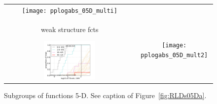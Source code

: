 \documentclass{article}
\newcommand{\rot}[2][2.5]{
  \hspace*{-3.5\baselineskip}%
  \begin{rotate}{90}\hspace{#1em}#2
  \end{rotate}}
\begin{document}
\begin{figure}[htbp!]
\begin{tabular}{@{}c@{}c@{}}
\texttt{[image: pplogabs\_05D\_multi]}
\\[-1ex]
\rot[1.5]{weak structure fcts}
\includegraphics[width=0.41\textwidth,trim=0 0mm 16mm 11mm, clip]{pprldistr_05D_mult2} &
\texttt{[image: pplogabs\_05D\_mult2]}
\end{tabular}
\vspace*{-0.5ex}
\caption{\label{fig:RLDs05Db}Subgroups of functions 5-D. See caption of Figure~\ref{fig:RLDs05Da}.}
\end{figure}
\end{document}
